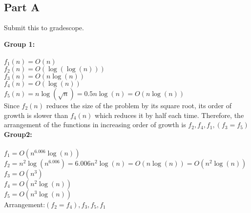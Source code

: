 \documentclass[12pt,twoside]{article}
\begin{document}

\begin{problems}

\section*{Part A}

\problem  %
Submit this to gradescope.

\begin{problemparts}
\problempart \textbf{Group 1:} \\
\\
$ f_{1}(n) = O(n)$\\
$ f_{2}(n) = O(\log(\log(n)))$\\
$ f_{3}(n) = O(n\log(n))$\\
$ f_{4}(n) = O(\log(n))$\\
$ f_{5}(n) = n\log(\sqrt{n}) = 0.5n\log(n) = O(n\log(n))$\\

Since $f_{2}(n)$ reduces the size of the problem by its square root, its order of growth is slower than $f_{4}(n)$  which reduces it by half each time. Therefore, the arrangement of the functions in increasing order of growth is $f_{2}, f_{4}, f_{1}, (f_{3} = f_{5})$ \\



\problempart \textbf{Group2:}\\
\\
$ f_{1} = O(n^{6.006}\log(n)) $ \\ 
$ f_{2} = n^{2}\log(n^{6.006})= 6.006n^{2}\log(n)=O(n\log(n)) = O(n^{2}\log(n)) $\\
$ f_{3} = O(n^{3}) $\\
$ f_{4} = O(n^{2}\log(n)) $\\
$ f_{5} = O(n^{3}\log(n)) $\\ 


Arrangement:$ (f_{2} = f_{4}), f_{3}, f_{5}, f_{1}$\\




\end{problemparts}


\end{problems}
\end{document}
